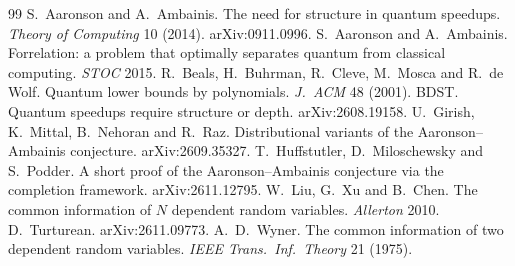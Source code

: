 \documentclass[11pt]{article}
\theoremstyle{definition}\newtheorem{definition}[theorem]{Definition}\newtheorem{problem}{Open Problem}
\theoremstyle{remark}\newtheorem{remark}[theorem]{Remark}
\begin{document}
\begin{thebibliography}{99}\small
{} S.~Aaronson and A.~Ambainis. The need for structure in quantum speedups. \emph{Theory of Computing} 10 (2014). arXiv:0911.0996.
 S.~Aaronson and A.~Ambainis. Forrelation: a problem that optimally separates quantum from classical computing. \emph{STOC} 2015.
 R.~Beals, H.~Buhrman, R.~Cleve, M.~Mosca and R.~de Wolf. Quantum lower bounds by polynomials. \emph{J.\ ACM} 48 (2001).
 BDST. Quantum speedups require structure or depth. arXiv:2608.19158.
 U.~Girish, K.~Mittal, B.~Nehoran and R.~Raz. Distributional variants of the Aaronson--Ambainis conjecture. arXiv:2609.35327.
 T.~Huffstutler, D.~Miloschewsky and S.~Podder. A short proof of the Aaronson--Ambainis conjecture via the completion framework. arXiv:2611.12795.
 W.~Liu, G.~Xu and B.~Chen. The common information of $N$ dependent random variables. \emph{Allerton} 2010.
 D.~Turturean. arXiv:2611.09773.
 A.~D.~Wyner. The common information of two dependent random variables. \emph{IEEE Trans.\ Inf.\ Theory} 21 (1975).
\end{thebibliography}
\end{document}
